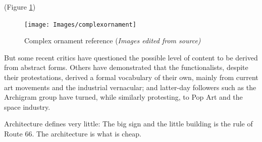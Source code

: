 
(Figure \ref{fig:complexornament})

     \begin{figure}[htb]
          \centering
          \texttt{[image: Images/complexornament]}
          \caption{Complex ornament reference  (\textit{Images edited from source)}}
          \label{fig:complexornament}
        \end{figure}






    But some recent critics  have  questioned  the possible level of content to  be derived  from  abstract forms.
    Others have  demonstrated that the functionalists,  despite  their protestations, derived  a  formal vocabulary of their own, mainly from current art movements and the industrial vernacular;
    and  latter-day  followers  such  as  the  Archigram  group  have turned,  while  similarly  protesting,  to Pop  Art and  the space  industry.\cite{Venturi1972}

    Architecture defines very little: The big sign and the little building is the rule of Route 66.
    The architecture is what is cheap.\cite{Venturi1972}

